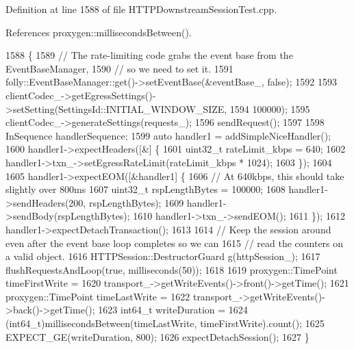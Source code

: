 Definition at line 1588 of file H\+T\+T\+P\+Downstream\+Session\+Test.\+cpp.



References proxygen\+::milliseconds\+Between().


\begin{DoxyCode}
1588                                                         \{
1589   \textcolor{comment}{// The rate-limiting code grabs the event base from the EventBaseManager,}
1590   \textcolor{comment}{// so we need to set it.}
1591   folly::EventBaseManager::get()->setEventBase(&eventBase\_, \textcolor{keyword}{false});
1592 
1593   clientCodec\_->getEgressSettings()->setSetting(SettingsId::INITIAL\_WINDOW\_SIZE,
1594                                                 100000);
1595   clientCodec\_->generateSettings(requests\_);
1596   sendRequest();
1597 
1598   InSequence handlerSequence;
1599   \textcolor{keyword}{auto} handler1 = addSimpleNiceHandler();
1600   handler1->expectHeaders([&] \{
1601       uint32\_t rateLimit\_kbps = 640;
1602       handler1->txn\_->setEgressRateLimit(rateLimit\_kbps * 1024);
1603     \});
1604 
1605   handler1->expectEOM([&handler1] \{
1606       \textcolor{comment}{// At 640kbps, this should take slightly over 800ms}
1607       uint32\_t rspLengthBytes = 100000;
1608       handler1->sendHeaders(200, rspLengthBytes);
1609       handler1->sendBody(rspLengthBytes);
1610       handler1->txn\_->sendEOM();
1611     \});
1612   handler1->expectDetachTransaction();
1613 
1614   \textcolor{comment}{// Keep the session around even after the event base loop completes so we can}
1615   \textcolor{comment}{// read the counters on a valid object.}
1616   HTTPSession::DestructorGuard g(httpSession\_);
1617   flushRequestsAndLoop(\textcolor{keyword}{true}, milliseconds(50));
1618 
1619   proxygen::TimePoint timeFirstWrite =
1620     transport\_->getWriteEvents()->front()->getTime();
1621   proxygen::TimePoint timeLastWrite =
1622     transport\_->getWriteEvents()->back()->getTime();
1623   int64\_t writeDuration =
1624     (int64\_t)millisecondsBetween(timeLastWrite, timeFirstWrite).count();
1625   EXPECT\_GE(writeDuration, 800);
1626   expectDetachSession();
1627 \}
\end{DoxyCode}
